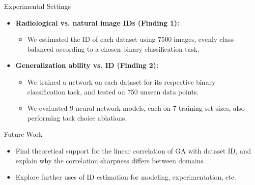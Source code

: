 \documentclass[final,hyperref={pdfpagelabels=false}]{beamer}
\begin{document}
\begin{frame}[t]
\begin{columns}[t]
\begin{column}{.47\textwidth}
\begin{block}{Experimental Settings}
    \begin{itemize}
        \item \textbf{Radiological vs. natural image IDs (Finding 1):}
        \begin{itemize}
            \item We estimated the ID of each dataset using $7500$ images, evenly class-balanced according to a chosen binary classification task.
        \end{itemize}

        \item \textbf{Generalization ability vs. ID (Finding 2):}
        \begin{itemize}
        \item We trained a network on each dataset for its respective binary classification task, and tested on 750 unseen data points.
        \item We evaluated 9 neural network models, each on 7 training set sizes, also performing task choice ablations.
        \end{itemize}
    \end{itemize}

\end{block}

\begin{block}{Future Work}

\begin{itemize}
\item Find theoretical support for the linear correlation of GA with dataset ID, and explain why the correlation sharpness differs between domains.
\item Explore further uses of ID estimation for modeling, experimentation, etc.
\end{itemize}

\end{block}


\end{column}
\end{columns}
\end{frame}
\end{document}
